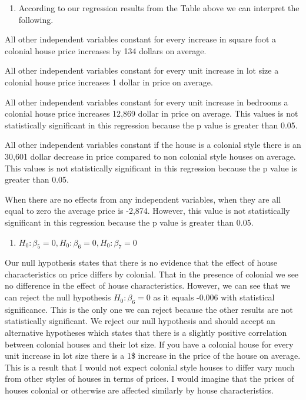 \documentclass[
  12pt,
  landscape]{article}
\providecommand{\tightlist}{%
  \setlength{\itemsep}{0pt}\setlength{\parskip}{0pt}}
\begin{document}
\begin{enumerate}
\def\labelenumi{\roman{enumi})}
\setcounter{enumi}{1}
\tightlist
\item
  According to our regression results from the Table above we can
  interpret the following.
\end{enumerate}

All other independent variables constant for every increase in square
foot a colonial house price increases by 134 dollars on average.

All other independent variables constant for every unit increase in lot
size a colonial house price increases 1 dollar in price on average.

All other independent variables constant for every unit increase in
bedrooms a colonial house price increases 12,869 dollar in price on
average. This values is not statistically significant in this regression
because the p value is greater than 0.05.

All other independent variables constant if the house is a colonial
style there is an 30,601 dollar decrease in price compared to non
colonial style houses on average. This values is not statistically
significant in this regression because the p value is greater than 0.05.

When there are no effects from any independent variables, when they are
all equal to zero the average price is -2,874. However, this value is
not statistically significant in this regression because the p value is
greater than 0.05.

\begin{enumerate}
\def\labelenumi{\roman{enumi})}
\setcounter{enumi}{2}
\tightlist
\item
  \({H_0: \beta_5 = 0, H_0: \beta_6 = 0, H_0: \beta_7 = 0 }\)
\end{enumerate}

Our null hypothesis states that there is no evidence that the effect of
house characteristics on price differs by colonial. That in the presence
of colonial we see no difference in the effect of house characteristics.
However, we can see that we can reject the null hypothesis
\(H_0: \beta_6 = 0\) as it equals -0.006 with statistical significance.
This is the only one we can reject because the other results are not
statistically significant. We reject our null hypothesis and should
accept an alternative hypotheses which states that there is a slightly
positive correlation between colonial houses and their lot size. If you
have a colonial house for every unit increase in lot size there is a 1\$
increase in the price of the house on average. This is a result that I
would not expect colonial style houses to differ vary much from other
styles of houses in terms of prices. I would imagine that the prices of
houses colonial or otherwise are affected similarly by house
characteristics.
\end{document}
